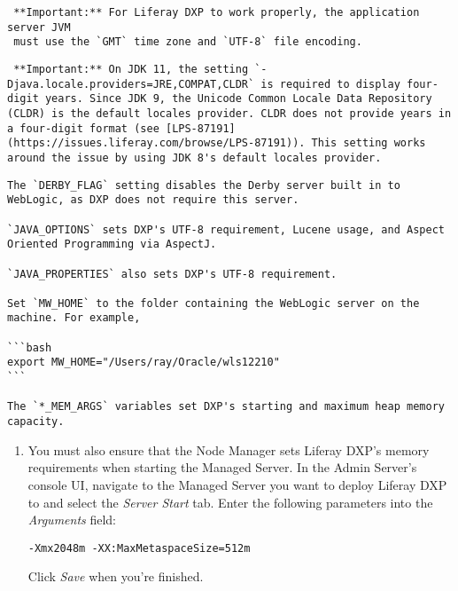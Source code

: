 \noindent\hrulefill

\begin{verbatim}
 **Important:** For Liferay DXP to work properly, the application server JVM
 must use the `GMT` time zone and `UTF-8` file encoding.
\end{verbatim}

\noindent\hrulefill

\noindent\hrulefill

\begin{verbatim}
 **Important:** On JDK 11, the setting `-Djava.locale.providers=JRE,COMPAT,CLDR` is required to display four-digit years. Since JDK 9, the Unicode Common Locale Data Repository (CLDR) is the default locales provider. CLDR does not provide years in a four-digit format (see [LPS-87191](https://issues.liferay.com/browse/LPS-87191)). This setting works around the issue by using JDK 8's default locales provider.
\end{verbatim}

\noindent\hrulefill

\begin{verbatim}
The `DERBY_FLAG` setting disables the Derby server built in to WebLogic, as DXP does not require this server.

`JAVA_OPTIONS` sets DXP's UTF-8 requirement, Lucene usage, and Aspect Oriented Programming via AspectJ.

`JAVA_PROPERTIES` also sets DXP's UTF-8 requirement.

Set `MW_HOME` to the folder containing the WebLogic server on the machine. For example,

```bash
export MW_HOME="/Users/ray/Oracle/wls12210"
```
    
The `*_MEM_ARGS` variables set DXP's starting and maximum heap memory capacity.
\end{verbatim}

\begin{enumerate}
\def\labelenumi{\arabic{enumi}.}
\setcounter{enumi}{4}
\item
  You must also ensure that the Node Manager sets Liferay DXP's memory
  requirements when starting the Managed Server. In the Admin Server's
  console UI, navigate to the Managed Server you want to deploy Liferay
  DXP to and select the \emph{Server Start} tab. Enter the following
  parameters into the \emph{Arguments} field:

\begin{verbatim}
-Xmx2048m -XX:MaxMetaspaceSize=512m
\end{verbatim}

  Click \emph{Save} when you're finished.
\end{enumerate}

